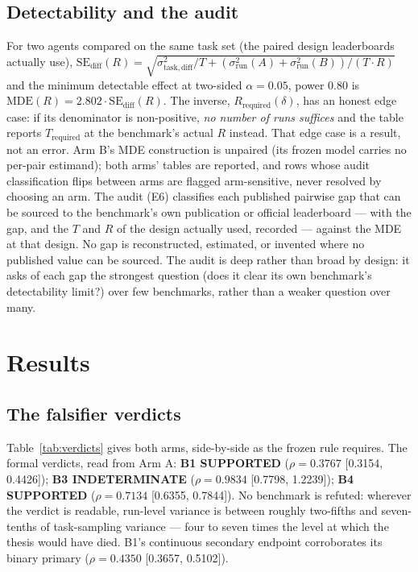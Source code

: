 \documentclass[11pt]{article}
\newcommand{\sR}{\sigma^2_{\mathrm{run}}}
\begin{document}
\subsection{Detectability and the audit}

For two agents compared on the same task set (the paired design
leaderboards actually use), $\mathrm{SE}_{\mathrm{diff}}(R) =
\sqrt{\sigma^2_{\mathrm{task,diff}}/T +
(\sR(A)+\sR(B))/(T\cdot R)}$ and the minimum detectable effect at
two-sided $\alpha = 0.05$, power 0.80 is $\mathrm{MDE}(R) = 2.802 \cdot
\mathrm{SE}_{\mathrm{diff}}(R)$. The inverse, $R_{\mathrm{required}}
(\delta)$, has an honest edge case: if its denominator is
non-positive, \emph{no number of runs suffices} and the table reports
$T_{\mathrm{required}}$ at the benchmark's actual $R$ instead. That
edge case is a result, not an error. Arm B's MDE construction is
unpaired (its frozen model carries no per-pair estimand); both arms'
tables are reported, and rows whose audit classification flips between
arms are flagged arm-sensitive, never resolved by choosing an arm.
The audit (E6) classifies each published pairwise gap that can be
sourced to the benchmark's own publication or official leaderboard ---
with the gap, and the $T$ and $R$ of the design actually used,
recorded --- against the MDE at that design. No gap is reconstructed,
estimated, or invented where no published value can be sourced. The
audit is deep rather than broad by design: it asks of each gap the
strongest question (does it clear its own benchmark's detectability
limit?) over few benchmarks, rather than a weaker question over many.

\section{Results}

\subsection{The falsifier verdicts}

Table~\ref{tab:verdicts} gives both arms, side-by-side as the frozen
rule requires. The formal verdicts, read from Arm A: \textbf{B1
SUPPORTED} ($\rho = 0.3767$ [0.3154, 0.4426]); \textbf{B3
INDETERMINATE} ($\rho = 0.9834$ [0.7798, 1.2239]); \textbf{B4
SUPPORTED} ($\rho = 0.7134$ [0.6355, 0.7844]). No benchmark is
refuted: wherever the verdict is readable, run-level variance is
between roughly two-fifths and seven-tenths of task-sampling variance
--- four to seven times the level at which the thesis would have died.
B1's continuous secondary endpoint corroborates its binary primary
($\rho = 0.4350$ [0.3657, 0.5102]).
\end{document}
